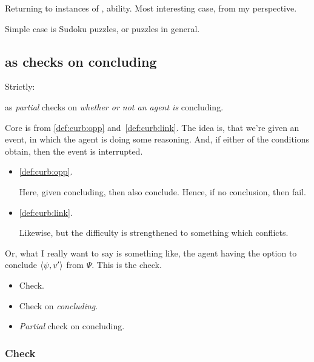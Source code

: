 \begin{note}
  Returning to instances of , ability.
  Most interesting case, from my perspective.

  Simple case is Sudoku puzzles, or puzzles in general.
\end{note}

\subsection{ as checks on concluding}
\label{cha:zS:sec:curbs:checks}

\begin{note}
  Strictly:

   as \emph{partial} checks on \emph{whether or not an agent is} concluding.

  Core is from \ref{def:curb:opp} and~\ref{def:curb:link}.
  The idea is, that we're given an event, in which the agent is doing some reasoning.
  And, if either of the conditions obtain, then the event is interrupted.

  \begin{itemize}
  \item
    \ref{def:curb:opp}.

    Here, given concluding, then also conclude.
    Hence, if no conclusion, then fail.

  \item
    \ref{def:curb:link}.

    Likewise, but the difficulty is strengthened to something which conflicts.
  \end{itemize}
\end{note}

\begin{note}
  Or, what I really want to say is something like, the agent having the option to conclude \(\langle \psi, v' \rangle\) from \(\Psi\).
  This is the check.
\end{note}

\begin{note}
  \begin{itemize}
  \item Check.
  \item Check on \emph{concluding}.
  \item \emph{Partial} check on concluding.
  \end{itemize}
\end{note}

\subsubsection{Check}

